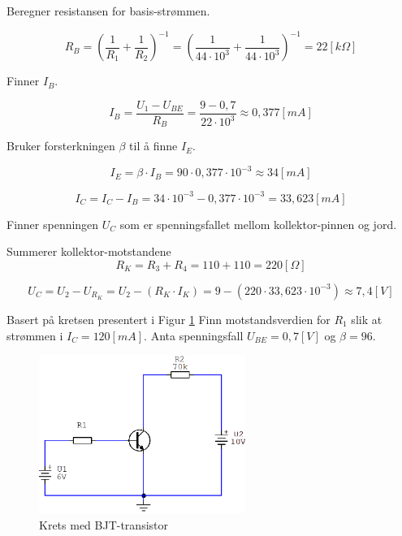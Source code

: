 \vspace{0.5cm} %

\begin{solution}[name=Løsningsforslag oppgave]
Beregner resistansen for basis-strømmen.

\[R_B= \left(\frac{1}{R_1} + \frac{1}{R_2} \right)^{-1} = \left( \frac{1}{44\cdot 10^3} + \frac{1}{44 \cdot 10^3}\right)^{-1}= 22 [k\Omega]\]

Finner $I_B$.

\[I_B = \frac{U_1-U_{BE}}{R_B} = \frac{9-0,7}{22 \cdot 10^3} \approx 0,377 [mA]\]

Bruker forsterkningen $\beta$ til å finne $I_E$.

\[I_E = \beta \cdot I_B = 90 \cdot 0,377 \cdot 10^{-3} \approx 34 [mA] \]

\[I_C = I_C - I_B = 34 \cdot 10^{-3} - 0,377 \cdot 10^{-3} = 33,623 [mA]\]

Finner spenningen $U_C$ som er spenningsfallet mellom kollektor-pinnen og jord.

Summerer kollektor-motstandene
\[R_K = R_3+R_4=110+110=220 [\Omega]\]

\[U_C=U_2-U_{R_{K}} = U_2 - \left( R_K \cdot I_K \right)=9- \left( 220 \cdot 33,623 \cdot 10^{-3} \right) \approx 7,4 [V]\]

\end{solution}

\vspace{0.5cm} %

\begin{question}[name=Oppgave, topic=transBJT]
	Basert på kretsen presentert i Figur \ref{fig:tranBJT5} Finn motstandsverdien for $R_1$ slik at strømmen i $I_C=120 [mA]$. Anta spenningsfall $U_{BE}=0,7[V]$ og $\beta=96$.
	
	\begin{figure}[H]
		\centering
		\includegraphics[width=0.6\textwidth]{transistor-BJT/figurer/krets5.png}
		\caption{Krets med BJT-transistor}
		\label{fig:tranBJT5}
	\end{figure}
	
\end{question}


